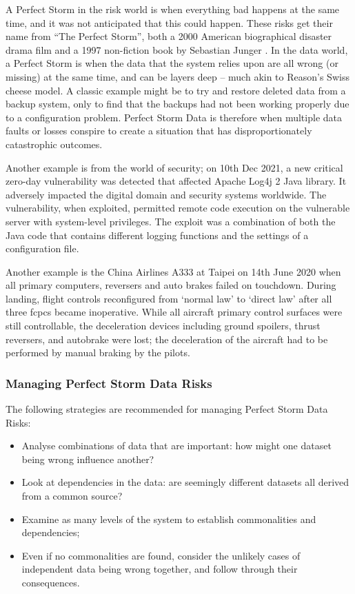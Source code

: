 A Perfect Storm in the risk world is when everything bad happens at the same time,
and it was not anticipated that this could happen.
These risks get their name from “The Perfect Storm”,
both a 2000 American biographical disaster drama film \cite{citation:perfectstorm:website}
and a 1997 non-fiction book by Sebastian Junger \cite{citation:perfectstorm:book}.
In the data world, a Perfect Storm is when the data that the system relies upon are all wrong
(or missing) at the same time, and can be layers deep – much akin to Reason’s Swiss cheese model.
A classic example might be to try and restore deleted data from a backup system,
only to find that the backups had not been working properly due to a configuration problem.
Perfect Storm Data is therefore when multiple data faults or losses conspire to create a
situation that has disproportionately catastrophic outcomes.

Another example is from the world of security;
on 10th Dec 2021, a new critical zero-day vulnerability was detected that affected
Apache Log4j 2 Java library.
It adversely impacted the digital domain and security systems worldwide.
The vulnerability, when exploited, permitted remote code execution on the vulnerable server
with system-level privileges.
The exploit was a combination of both the Java code that contains different logging functions
and the settings of a configuration file.

Another example is the China Airlines A333 at Taipei on 14th June 2020  when all primary computers,
reversers and auto brakes failed on touchdown.
During landing, flight controls reconfigured from ‘normal law’ to ‘direct law’ after all three
\glspl{fcpc} became inoperative.
While all aircraft primary control surfaces were still controllable,
the deceleration devices including ground spoilers, thrust reversers, and autobrake were lost;
the deceleration of the aircraft had to be performed by manual braking by the pilots.

\subsubsection{Managing Perfect Storm Data Risks}
The following strategies are recommended for managing Perfect Storm Data Risks:
\begin{itemize}
\item Analyse combinations of data that are important: how might one \gls{dataset} being wrong influence another?
\item Look at dependencies in the data: are seemingly different \glspl{dataset} all derived from a common source?
\item Examine as many levels of the system to establish commonalities and dependencies;
\item Even if no commonalities are found,
consider the unlikely cases of independent data being wrong together,
and follow through their consequences.
\end{itemize}


